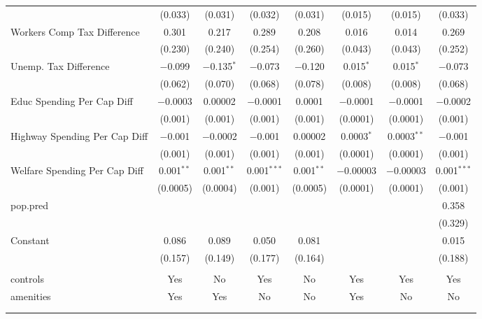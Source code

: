 \begin{table}[!htbp]
\begin{tabular}{@{\extracolsep{5pt}}lccccccc}
  & (0.033) & (0.031) & (0.032) & (0.031) & (0.015) & (0.015) & (0.033) \\ 
  Workers Comp Tax Difference & 0.301 & 0.217 & 0.289 & 0.208 & 0.016 & 0.014 & 0.269 \\ 
  & (0.230) & (0.240) & (0.254) & (0.260) & (0.043) & (0.043) & (0.252) \\ 
  Unemp. Tax Difference & $-$0.099 & $-$0.135$^{*}$ & $-$0.073 & $-$0.120 & 0.015$^{*}$ & 0.015$^{*}$ & $-$0.073 \\ 
  & (0.062) & (0.070) & (0.068) & (0.078) & (0.008) & (0.008) & (0.068) \\ 
  Educ Spending Per Cap Diff & $-$0.0003 & 0.00002 & $-$0.0001 & 0.0001 & $-$0.0001 & $-$0.0001 & $-$0.0002 \\ 
  & (0.001) & (0.001) & (0.001) & (0.001) & (0.0001) & (0.0001) & (0.001) \\ 
  Highway Spending Per Cap Diff & $-$0.001 & $-$0.0002 & $-$0.001 & 0.00002 & 0.0003$^{*}$ & 0.0003$^{**}$ & $-$0.001 \\ 
  & (0.001) & (0.001) & (0.001) & (0.001) & (0.0001) & (0.0001) & (0.001) \\ 
  Welfare Spending Per Cap Diff & 0.001$^{**}$ & 0.001$^{**}$ & 0.001$^{***}$ & 0.001$^{**}$ & $-$0.00003 & $-$0.00003 & 0.001$^{***}$ \\ 
  & (0.0005) & (0.0004) & (0.001) & (0.0005) & (0.0001) & (0.0001) & (0.001) \\ 
  pop.pred &  &  &  &  &  &  & 0.358 \\ 
  &  &  &  &  &  &  & (0.329) \\ 
  Constant & 0.086 & 0.089 & 0.050 & 0.081 &  &  & 0.015 \\ 
  & (0.157) & (0.149) & (0.177) & (0.164) &  &  & (0.188) \\ 
 \hline \\[-1.8ex] 
controls & Yes & No & Yes & No & Yes & Yes & Yes \\ 
amenities & Yes & Yes & No & No & Yes & No & No \\ 
\hline \\[-1.8ex] 
\hline 
\hline \\[-1.8ex] 
\end{tabular} 
\end{table} 
